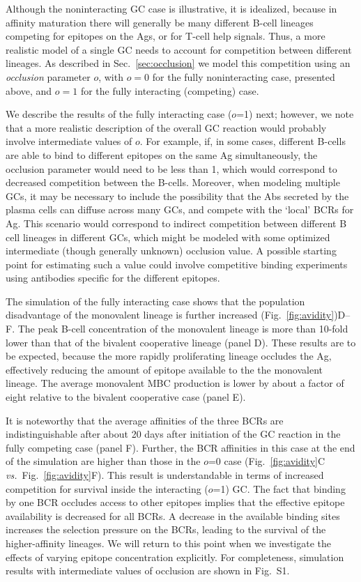 \documentclass[utf8]{frontiersHLTH}%
\newcommand{\vo}[1]{#1} %
\def\vs {{\it vs.}}
\newcommand{\fig}[1]{Fig.~\ref{fig:#1}}
\newcommand{\Sec}[1]{Sec.~\ref{sec:#1}}
\renewcommand{\sec}[1]{\Sec{#1}}
\newcommand{\occl}{o}
\begin{document}
Although the noninteracting GC case is illustrative, it is idealized, because
in affinity maturation there will generally be many different B-cell
lineages competing for epitopes on the Ags, or for T-cell help
signals. Thus, a more realistic model of a single GC needs to account for
competition between different lineages. As described in \sec{occlusion} we
model this competition using an \textit{occlusion} parameter $\occl$, with $\occl=0$
for the fully noninteracting case, presented above, and $\occl=1$ for the fully interacting
(competing) case.

We describe the results of the fully interacting case ($\occl$=1) next; however, 
we note that a more realistic description of the overall GC reaction would probably
involve intermediate values of $o$. For example,
if, in some cases, different B-cells are able to bind to different epitopes
on the same Ag simultaneously, the occlusion parameter would need to be less than 1, which would
correspond to decreased competition between the B-cells. Moreover, when modeling
multiple GCs, it may be necessary to include the possibility that the Abs secreted by the plasma cells
can diffuse across many GCs, and compete with the `local' BCRs for
Ag.\cite{zhang13} This scenario would correspond to indirect
competition between different B cell lineages in different GCs, which might
be modeled with some optimized intermediate (though generally unknown) occlusion value.
\vo{A possible starting point for estimating such a value
could involve competitive binding experiments using antibodies specific for
the different epitopes.} 

The simulation of the fully interacting case shows that the
population disadvantage of the monovalent lineage is further increased
(\fig{avidity})D--F. The peak B-cell concentration of the monovalent lineage is more
than 10-fold lower than that of the bivalent cooperative lineage (panel D). These
results are to be expected, because the more rapidly proliferating lineage
occludes the Ag, effectively reducing the amount of epitope available to the
the monovalent lineage. The average monovalent MBC production is lower
by about a factor of \vo{eight} relative to the bivalent cooperative case (panel E).

It is noteworthy that the average affinities of the three BCRs are
indistinguishable after about 20 days after initiation of the GC reaction
in the fully competing case (panel F). Further, the BCR affinities in this
case at the end of the
simulation are higher than those in the $\occl$=0 case (\fig{avidity}C
\vs~\fig{avidity}F). This result is understandable in terms of increased
competition for survival inside the interacting ($\occl$=1) GC.  The fact
that binding by one BCR occludes access to other epitopes implies that
the effective epitope availability is decreased for all BCRs. 
A decrease in the available binding sites increases the
selection pressure on the BCRs, leading to the survival of the higher-affinity
lineages. We will return to this point when we investigate
the effects of varying epitope concentration explicitly. 
For completeness, simulation
results with intermediate values of occlusion are shown in Fig.~S1.
\end{document}
